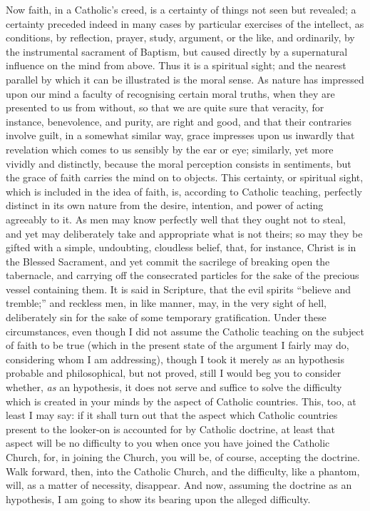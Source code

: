 Now faith, in a Catholic's creed, is a certainty of things not seen
but revealed; a certainty preceded indeed in many cases by particular
exercises of the intellect, as conditions, by reflection, prayer,
study, argument, or the like, and ordinarily, by the instrumental
sacrament of Baptism, but caused directly by a supernatural influence
on the mind from above. Thus it is a spiritual sight; and the nearest
parallel by which it can be illustrated is the moral sense. As nature
has impressed upon our mind a faculty of recognising certain moral
truths, when they are presented to us from without, so that we are
quite sure that veracity, for instance, benevolence, and purity, are
right and good, and that their contraries involve guilt, in a somewhat
similar way, grace impresses upon us inwardly that revelation which
comes to us sensibly by the ear or eye; similarly, yet more vividly
and distinctly, because the moral perception consists in sentiments,
but the grace of faith carries the mind on to objects. This certainty,
or spiritual sight, which is included in the idea of faith, is,
according to Catholic teaching, perfectly distinct in its own nature
from the desire, intention, and power of acting agreeably to it. As
men may know perfectly well that they ought not to steal, and yet may
deliberately take and appropriate what is not theirs; so may they be
gifted with a simple, undoubting, cloudless belief, that, for
instance, Christ is in the Blessed Sacrament, and yet commit the
sacrilege of breaking open the tabernacle, and carrying off the
consecrated particles for the sake of the precious vessel containing
them. It is said in Scripture, that the evil spirits ``believe and
tremble;'' and reckless men, in like manner, may, in the very
sight of hell, deliberately sin for the sake of some temporary
gratification. Under these circumstances, even though I did not assume
the Catholic teaching on the subject of faith to be true (which in the
present state of the argument I fairly may do, considering whom I am
addressing), though I took it merely as an hypothesis probable and
philosophical, but not proved, still I would beg you to consider
whether, \emph{as} an hypothesis, it does not serve and suffice to
solve the difficulty which is created in your minds by the aspect of
Catholic countries. This, too, at least I may say: if it shall turn
out that the aspect which Catholic countries present to the looker-on
is accounted for by Catholic doctrine, at least that aspect will be no
difficulty to you when once you have joined the Catholic Church, for,
in joining the Church, you will be, of course, accepting the doctrine.
Walk forward, then, into the Catholic Church, and the difficulty, like
a phantom, will, as a matter of necessity, disappear. And now,
assuming the doctrine as an hypothesis, I am going to show its bearing
upon the alleged difficulty.

